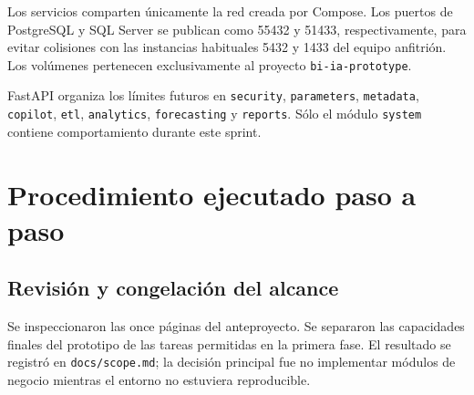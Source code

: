 \documentclass[11pt,letterpaper]{article}
\newcommand{\file}[1]{\texttt{#1}}
\begin{document}
\begin{center}
\end{center}

Los servicios comparten únicamente la red creada por Compose. Los puertos de PostgreSQL y SQL Server se publican como 55432 y 51433, respectivamente, para evitar colisiones con las instancias habituales 5432 y 1433 del equipo anfitrión. Los volúmenes pertenecen exclusivamente al proyecto \file{bi-ia-prototype}.

FastAPI organiza los límites futuros en \file{security}, \file{parameters}, \file{metadata}, \file{copilot}, \file{etl}, \file{analytics}, \file{forecasting} y \file{reports}. Sólo el módulo \file{system} contiene comportamiento durante este sprint.

\section{Procedimiento ejecutado paso a paso}

\subsection{Revisión y congelación del alcance}

Se inspeccionaron las once páginas del anteproyecto. Se separaron las capacidades finales del prototipo de las tareas permitidas en la primera fase. El resultado se registró en \file{docs/scope.md}; la decisión principal fue no implementar módulos de negocio mientras el entorno no estuviera reproducible.
\end{document}
